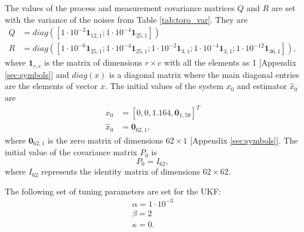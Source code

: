 The values of the process and measurement covariance matrices $Q$ and $R$ are set with the variance of the noises from Table \ref{tab:toro_var}. They are 
$$  \begin{aligned}
         Q &= diag([1\cdot{10}^{-2} \textbf{1}_{12,1}; 1\cdot{10}^{-4} \textbf{1}_{25,1}])  \\
         R &= diag([1\cdot{10}^{-6} \textbf{1}_{25,1}; 1\cdot{10}^{-4}\textbf{1}_{25,1}; 1\cdot{10}^{-2}\textbf{1}_{3,1};1\cdot{10}^{-4}\textbf{1}_{3,1}; 1\cdot{10}^{-12}\textbf{1}_{36,1} ]),
     \end{aligned}$$
where $\textbf{1}_{r,c}$ is the matrix of dimensions $r \times c$ with all the elements as 1 [Appendix \ref{sec:symbols}] and $diag(x)$ is a diagonal matrix where the main diagonal entries are the elements of vector $x$. 
The initial values of the system $x_0$ and estimator $\hat x_0$ are
$$ \begin{aligned} x_0 &= [0,0,1.164,\textbf{0}_{1,59}]^T \\ \hat x_0 &= \textbf{0}_{62,1}, \end{aligned} $$  where $\textbf{0}_{62,1}$ is the zero matrix of dimensions $62 \times 1$ [Appendix \ref{sec:symbols}].
The initial value of the covariance matrix $P_0$ is $$ P_0 = I_{62},$$ where $I_{62}$ represents the identity matrix of dimensions $62\times62$. 

The following set of tuning parameters are set for the UKF:
$$ \begin{aligned} \alpha =1\cdot {10}^{-3} \\ \beta =2 \\ \kappa=0.  \end{aligned} $$



